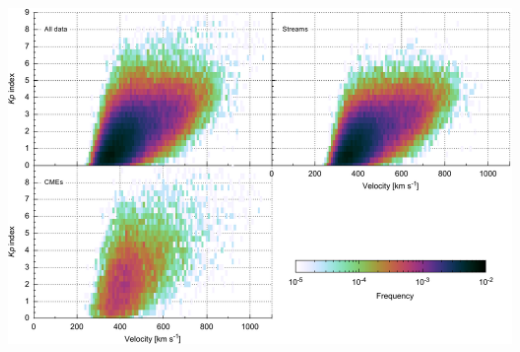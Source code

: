 \documentclass[11pt,aspectratio=1610]{beamer}	%
\newcommand{\captionoftiny}[2]{\captionof{#1}{\color{gray} \tiny #2}}
\begin{document}
\begin{frame}[c]{}{}
	\begin{columns}[c]
		
		\includegraphics[width=\textwidth]{../figures_of_mine/chapter2/Kp_2dhistogram_V_sws_e.pdf}


	\end{columns}
\end{frame}
\end{document}
